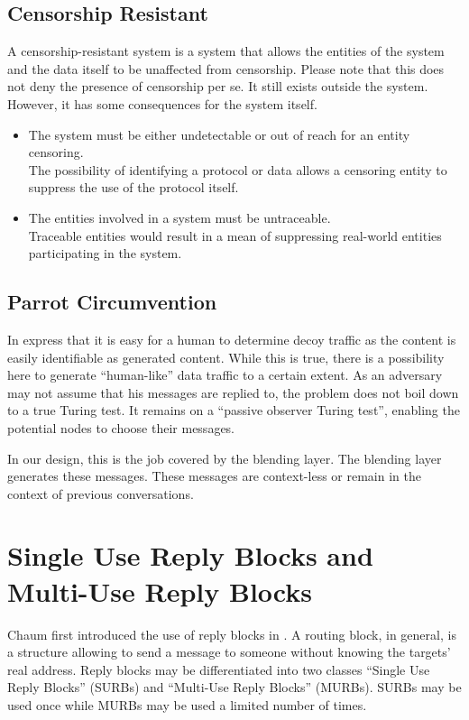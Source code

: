 \subsection{Censorship Resistant}
A censorship-resistant system is a system that allows the entities of the system and the data itself to be unaffected from censorship. Please note that this does not deny the presence of censorship per se. It still exists outside the system. However, it has some consequences for the system itself.

\begin{itemize}
	\item The system must be either undetectable or out of reach for an entity censoring.\\
	The possibility of identifying a protocol or data allows a censoring entity to suppress the use of the protocol itself. 
	\item The entities involved in a system must be untraceable.\\
	Traceable entities would result in a mean of suppressing real-world entities participating in the system.
\end{itemize}

\subsection{Parrot Circumvention}
In \cite{oakland2013-parrot} \citeauthor{oakland2013-parrot} express that it is easy for a human to determine decoy traffic as the content is easily identifiable as generated content. While this is true, there is a possibility here to generate ``human-like'' data traffic to a certain extent. As an adversary may not assume that his messages are replied to, the problem does not boil down to a true Turing test. It remains on a ``passive observer Turing test'', enabling the potential nodes to choose their messages. 

In our design, this is the job covered by the blending layer. The blending layer generates these messages. These messages are context-less or remain in the context of previous conversations.

\section{Single Use Reply Blocks and Multi-Use Reply Blocks}
Chaum first introduced the use of reply blocks in \cite{CHAUM1}. A routing block, in general, is a structure allowing to send a message to someone without knowing the targets' real address. Reply blocks may be differentiated into two classes ``Single Use Reply Blocks'' (SURBs)  and ``Multi-Use Reply Blocks'' (MURBs). SURBs may be used once while MURBs may be used a limited number of times. 

